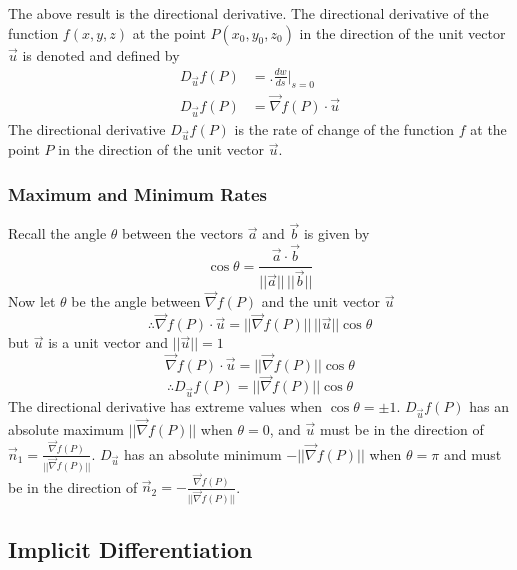 \documentclass[14pt]{article}
\begin{document}
    The above result is the directional derivative. The directional derivative of the function $f(x,y,z)$ at the point $P(x_0,y_0,z_0)$ in the direction of the unit vector $\vec u$ is denoted and defined by
    \begin{align*}
        D_{\vec u}f(P)&=\bigg. \frac{dw}{ds}\bigg|_{s=0}\\
        D_{\vec u}f(P)&=\vec\nabla f(P)\cdot \vec u
    \end{align*}
    The directional derivative $D_{\vec u}f(P)$ is the rate of change of the function $f$ at the point $P$ in the direction of the unit vector $\vec u$.
    \subsubsection{Maximum and Minimum Rates}
    Recall the angle $\theta$ between the vectors $\vec a$ and $\vec b$ is given by
    $$\cos\theta=\frac{\vec a\cdot \vec b}{||\vec a||\, ||\vec b||}$$
    Now let $\theta$ be the angle between $\vec\nabla f(P)$ and the unit vector $\vec u$
    $$\therefore \vec\nabla f(P)\cdot \vec u=||\vec\nabla f(P)||\,||\vec u||\cos\theta$$
    but $\vec u$ is a unit vector and $||\vec u||=1$
    $$\vec\nabla f(P)\cdot \vec u=||\vec\nabla f(P)||\cos\theta$$
    $$\therefore D_{\vec u}f(P)= ||\vec\nabla f(P)||\cos\theta$$
    The directional derivative has extreme values when $\cos\theta=\pm1$. $D_{\vec u}f(P)$ has an absolute maximum $||\vec\nabla f(P)||$ when $\theta=0$, and $\vec u$ must be in the direction of $\vec n_1=\frac{\vec\nabla f(P)}{||\vec\nabla f(P)||}$. $D_{\vec u}$ has an absolute minimum $-||\vec\nabla f(P)||$ when $\theta=\pi$ and must be in the direction of $\vec n_2=-\frac{\vec\nabla f(P)}{||\vec\nabla f(P)||}$.
    \subsection{Implicit Differentiation}
\end{document}

